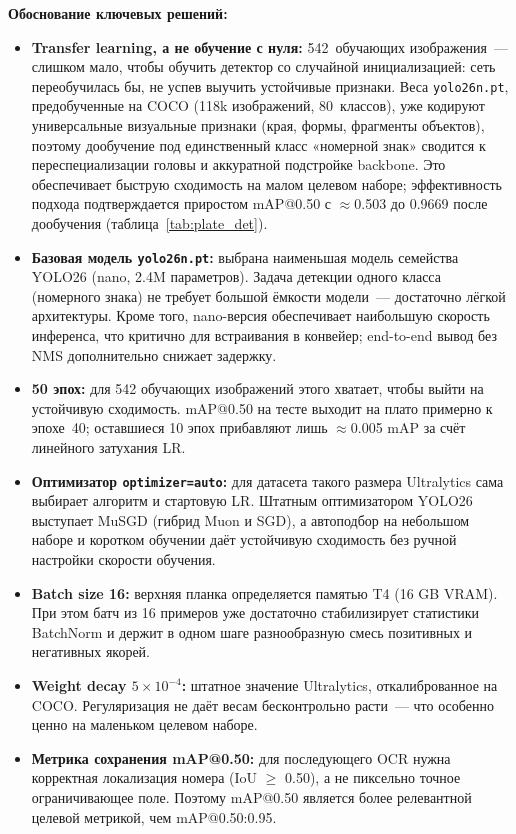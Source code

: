 \documentclass[10pt,a4paper]{report}
\numberwithin{equation}{chapter}
\numberwithin{figure}{chapter}
\numberwithin{table}{chapter}
\begin{document}
\textbf{Обоснование ключевых решений:}
\begin{itemize}
  \item \textbf{Transfer learning, а не обучение с нуля:} 542~обучающих
    изображения~--- слишком мало, чтобы обучить детектор со случайной
    инициализацией: сеть переобучилась бы, не успев выучить устойчивые
    признаки. Веса \texttt{yolo26n.pt}, предобученные на COCO
    (118k изображений, 80~классов), уже кодируют универсальные визуальные
    признаки (края, формы, фрагменты объектов), поэтому дообучение под
    единственный класс «номерной знак» сводится к переспециализации головы
    и аккуратной подстройке backbone. Это обеспечивает быструю сходимость на
    малом целевом наборе; эффективность подхода подтверждается приростом
    mAP@0.50 с $\approx$0.503 до 0.9669 после дообучения
    (таблица~\ref{tab:plate_det}).

  \item \textbf{Базовая модель \texttt{yolo26n.pt}:} выбрана наименьшая
    модель семейства YOLO26 (nano, 2.4M параметров). Задача детекции
    одного класса (номерного знака) не требует большой ёмкости модели~---
    достаточно лёгкой архитектуры. Кроме того, nano-версия обеспечивает
    наибольшую скорость инференса, что критично для встраивания в конвейер;
    end-to-end вывод без NMS дополнительно снижает задержку.

  \item \textbf{50 эпох:} для 542 обучающих изображений этого хватает,
    чтобы выйти на устойчивую сходимость. mAP@0.50 на тесте выходит на
    плато примерно к эпохе~40; оставшиеся 10 эпох прибавляют лишь
    $\approx$0.005 mAP за счёт линейного затухания LR.

  \item \textbf{Оптимизатор \texttt{optimizer=auto}:}
    для датасета такого размера Ultralytics сама выбирает алгоритм и
    стартовую LR. Штатным оптимизатором YOLO26 выступает MuSGD (гибрид
    Muon и SGD), а автоподбор на небольшом наборе и коротком обучении
    даёт устойчивую сходимость без ручной настройки скорости обучения.

  \item \textbf{Batch size 16:} верхняя планка определяется памятью
    T4 (16 GB VRAM). При этом батч из 16 примеров уже достаточно
    стабилизирует статистики BatchNorm и держит в одном шаге
    разнообразную смесь позитивных и негативных якорей.

  \item \textbf{Weight decay $5\!\times\!10^{-4}$:} штатное значение
    Ultralytics, откалиброванное на COCO. Регуляризация не даёт весам
    бесконтрольно расти~--- что особенно ценно на маленьком целевом
    наборе.

  \item \textbf{Метрика сохранения mAP@0.50:} для последующего OCR
    нужна корректная локализация номера (IoU $\geq$ 0.50), а не
    пиксельно точное ограничивающее поле. Поэтому mAP@0.50 является
    более релевантной целевой метрикой, чем mAP@0.50:0.95.
\end{itemize}
\end{document}
